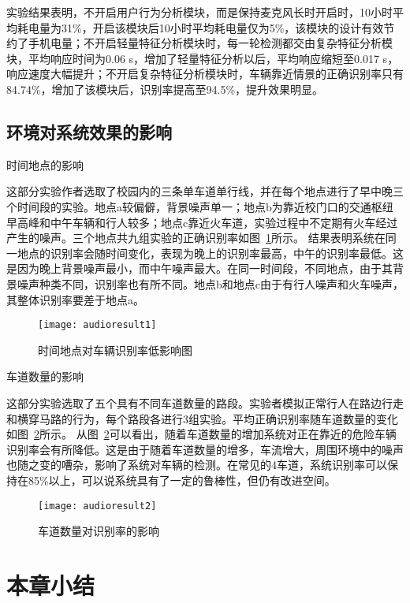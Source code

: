 实验结果表明，不开启用户行为分析模块，而是保持麦克风长时开启时，10小时平均耗电量为31\%，开启该模块后10小时平均耗电量仅为5\%，该模块的设计有效节约了手机电量；不开启轻量特征分析模块时，每一轮检测都交由复杂特征分析模块，平均响应时间为0.06 s，增加了轻量特征分析以后，平均响应缩短至0.017 s，响应速度大幅提升；不开启复杂特征分析模块时，车辆靠近情景的正确识别率只有84.74\%，增加了该模块后，识别率提高至94.5\%，提升效果明显。


\subsection{环境对系统效果的影响}
{\hei 时间地点的影响}

这部分实验作者选取了校园内的三条单车道单行线，并在每个地点进行了早中晚三个时间段的实验。地点a较偏僻，背景噪声单一；地点b为靠近校门口的交通枢纽早高峰和中午车辆和行人较多；地点c靠近火车道，实验过程中不定期有火车经过产生的噪声。三个地点共九组实验的正确识别率如图~\ref{fig:audioresult1}所示。
结果表明系统在同一地点的识别率会随时间变化，表现为晚上的识别率最高，中午的识别率最低。这是因为晚上背景噪声最小，而中午噪声最大。在同一时间段，不同地点，由于其背景噪声种类不同，识别率也有所不同。地点b和地点c由于有行人噪声和火车噪声，其整体识别率要差于地点a。

\begin{figure}[htbp] %
  \centering
  \texttt{[image: audioresult1]}
  \caption{时间地点对车辆识别率低影响图}
  \label{fig:audioresult1}
\end{figure}

{\hei 车道数量的影响}

这部分实验选取了五个具有不同车道数量的路段。实验者模拟正常行人在路边行走和横穿马路的行为，每个路段各进行3组实验。平均正确识别率随车道数量的变化如图~\ref{fig:audioresult2}所示。
从图~\ref{fig:audioresult2}可以看出，随着车道数量的增加系统对正在靠近的危险车辆识别率会有所降低。这是由于随着车道数量的增多，车流增大，周围环境中的噪声也随之变的嘈杂，影响了系统对车辆的检测。在常见的4车道，系统识别率可以保持在85\%以上，可以说系统具有了一定的鲁棒性，但仍有改进空间。

\begin{figure}[htbp] %
  \centering
  \texttt{[image: audioresult2]}
  \caption{车道数量对识别率的影响}
  \label{fig:audioresult2}
\end{figure}

\section{本章小结}


